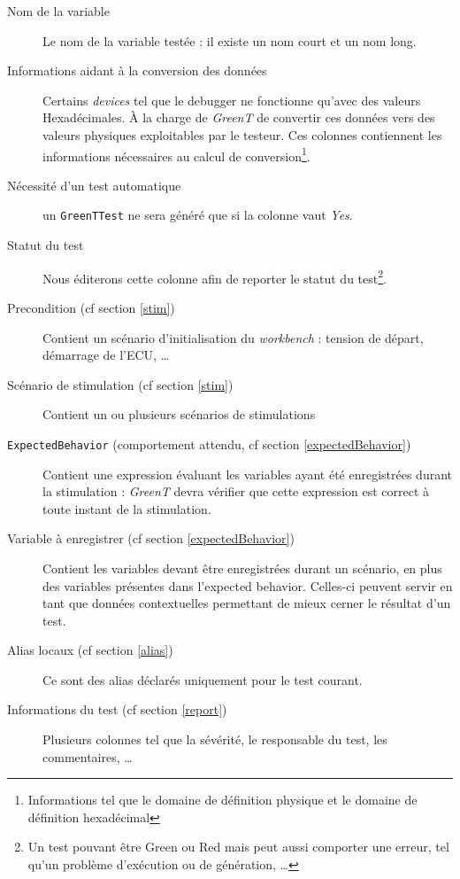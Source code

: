 		\begin{description} 
			\item[Nom de la variable] Le nom de la variable testée : il existe un nom court et un nom long.
			\item[Informations aidant à la conversion des données] Certains \textit{devices} tel que le debugger ne fonctionne qu'avec des
				valeurs Hexadécimales. À la charge de \textit{GreenT} de convertir ces données vers des valeurs physiques exploitables par
				le testeur. Ces colonnes contiennent les informations nécessaires au calcul de conversion\footnote{Informations tel que le
				domaine de définition physique et le domaine de définition hexadécimal}.
			\item[Nécessité d'un test automatique] un \texttt{GreenTTest} ne sera généré que si la colonne vaut \textit{Yes}.
			\item[Statut du test] Nous éditerons cette colonne afin de reporter le statut du test\footnote{Un test pouvant être Green ou Red
				mais peut aussi comporter une erreur, tel qu'un problème d'exécution ou de génération, \ldots}.
			\item[Precondition (cf section \ref{stim})] Contient un scénario d'initialisation du \textit{workbench} : tension de départ,
				démarrage de l'ECU, \ldots
			\item[Scénario de stimulation (cf section \ref{stim})] Contient un ou plusieurs scénarios de stimulations
			\item[\texttt{ExpectedBehavior} (comportement attendu, cf section \ref{expectedBehavior})] Contient une expression évaluant les variables ayant été enregistrées durant la stimulation : \textit{GreenT} devra vérifier que cette expression est correct à toute instant de la stimulation.
			\item[Variable à enregistrer (cf section \ref{expectedBehavior})] Contient les variables devant être enregistrées durant un
				scénario, en plus des variables présentes dans l'expected behavior. Celles-ci peuvent servir en tant que données
				contextuelles permettant de mieux cerner le résultat d'un test.
			\item[Alias locaux (cf section \ref{alias})] Ce sont des alias déclarés uniquement pour le test courant.
			\item[Informations du test (cf section \ref{report})] Plusieurs colonnes tel que la sévérité, le responsable du test, les commentaires, \ldots
		\end{description}

